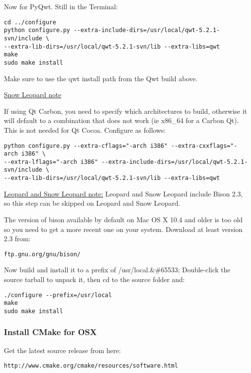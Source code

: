 Now for PyQwt.  Still in the Terminal:

\begin{verbatim}
cd ../configure
python configure.py --extra-include-dirs=/usr/local/qwt-5.2.1-svn/include \
--extra-lib-dirs=/usr/local/qwt-5.2.1-svn/lib --extra-libs=qwt
make
sudo make install
\end{verbatim}

Make sure to use the qwt install path from the Qwt build above.

\underline{Snow Leopard note}

If using Qt Carbon, you need to specify which architectures to build, otherwise
it will default to a combination that does not work (ie x86\_64 for a Carbon Qt).
This is not needed for Qt Cocoa. Configure as follows:

\begin{verbatim}
python configure.py --extra-cflags="-arch i386" --extra-cxxflags="-arch i386" \
--extra-lflags="-arch i386" --extra-include-dirs=/usr/local/qwt-5.2.1-svn/include \
--extra-lib-dirs=/usr/local/qwt-5.2.1-svn/lib --extra-libs=qwt
\end{verbatim}

\minisec{Additional Dependencies : Bison}
\underline{Leopard and Snow Leopard note:} Leopard and Snow Leopard include Bison 2.3, so this step can be skipped on Leopard and Snow Leopard.

The version of bison available by default on Mac OS X 10.4 and older is too old so you need to
get a more recent one on your system. Download at least version 2.3 from:

\begin{verbatim}
ftp.gnu.org/gnu/bison/
\end{verbatim}

Now build and install it to a prefix of /usr/local.\&\#65533; Double-click the source
tarball to unpack it, then cd to the source folder and:

\begin{verbatim}
./configure --prefix=/usr/local 
make
sudo make install 
\end{verbatim}

\subsubsection{Install CMake for OSX}
Get the latest source release from here:

\begin{verbatim}
http://www.cmake.org/cmake/resources/software.html
\end{verbatim}

